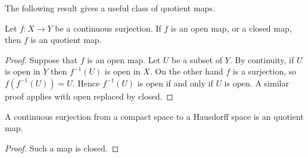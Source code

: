 The following result gives a useful class of quotient maps.
\begin{proposition}
Let $f:X\to Y$ be a continuous surjection. If $f$ is an open map, or a closed map, then $f$ is an quotient map.
\end{proposition}
\begin{proof}
Suppose that $f$ is an open map. Let $U$ be a subset of $Y$. By continuity, if $U$ is open in $Y$ then $f^{-1}(U)$ is open in $X$. On the other hand $f$ is a surjection, 
so $f(f^{-1}(U))=U$. Hence $f^{-1}(U)$ is open if and only if $U$ is open. A similar proof applies with open replaced by closed.
\end{proof}
\begin{corollary}
A continuous surjection from a compact space to a Hausdorff space is an quotient map.
\end{corollary}
\begin{proof}
Such a map is closed.
\end{proof}
